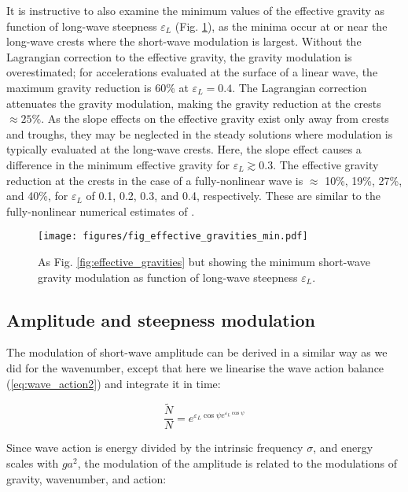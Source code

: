 \documentclass[lineno]{jfm}
\begin{document}
It is instructive to also examine the minimum values of the
effective gravity as function of long-wave steepness $\varepsilon_L$
(Fig. \ref{fig:effective_gravities_min}), as the minima occur at or
near the long-wave crests where the short-wave modulation is largest.
Without the Lagrangian correction to the effective gravity, the gravity
modulation is overestimated; for accelerations evaluated at the surface of a
linear wave, the maximum gravity reduction is 60\% at $\varepsilon_L = 0.4$.
The Lagrangian correction attenuates the gravity modulation, making the
gravity reduction at the crests $\approx 25\%$.
As the slope effects on the effective gravity exist only away from crests and
troughs, they may be neglected in the steady solutions where modulation is
typically evaluated at the long-wave crests.
Here, the slope effect causes a difference in the minimum effective gravity
for $\varepsilon_L \gtrsim 0.3$.
The effective gravity reduction at the crests in the case of a fully-nonlinear
wave is $\approx$ 10\%, 19\%, 27\%, and 40\%, 
for $\varepsilon_L$ of 0.1, 0.2, 0.3, and 0.4, respectively.
These are similar to the fully-nonlinear numerical estimates of
\citet{longuet1986eulerian,longuet1987propagation}.

\begin{figure}
\centering
\texttt{[image: figures/fig\_effective\_gravities\_min.pdf]}
\caption{
  As Fig. \ref{fig:effective_gravities} but showing the minimum short-wave
  gravity modulation as function of long-wave steepness $\varepsilon_L$.
}
\label{fig:effective_gravities_min}
\end{figure}

\subsection{Amplitude and steepness modulation}
\label{subsection:amplitude_modulation}

The modulation of short-wave amplitude can be derived in a similar way as we did
for the wavenumber, except that here we linearise the wave action balance
(\ref{eq:wave_action2}) and integrate it in time:

\begin{equation}
\label{eq:wave_action_modulation}
\frac{\widetilde{N}}{N} = e^{\varepsilon_L \cos{\psi} e^{\varepsilon_L \cos{\psi}}}
\end{equation}

Since wave action is energy divided by the intrinsic frequency $\sigma$,
and energy scales with $ga^2$, the modulation of the amplitude is related to the
modulations of gravity, wavenumber, and action:
\end{document}
